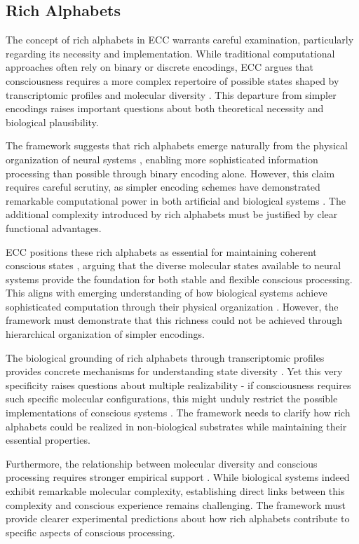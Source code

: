 \subsection{Rich Alphabets}

The concept of rich alphabets in ECC warrants careful examination, particularly regarding its necessity and implementation. While traditional computational approaches often rely on binary or discrete encodings, ECC argues that consciousness requires a more complex repertoire of possible states shaped by transcriptomic profiles and molecular diversity \cite{koch2019feeling}. This departure from simpler encodings raises important questions about both theoretical necessity and biological plausibility.

The framework suggests that rich alphabets emerge naturally from the physical organization of neural systems \cite{varela2016embodied}, enabling more sophisticated information processing than possible through binary encoding alone. However, this claim requires careful scrutiny, as simpler encoding schemes have demonstrated remarkable computational power in both artificial and biological systems \cite{dennett2017bacteria}. The additional complexity introduced by rich alphabets must be justified by clear functional advantages.

ECC positions these rich alphabets as essential for maintaining coherent conscious states \cite{thompson2014waking}, arguing that the diverse molecular states available to neural systems provide the foundation for both stable and flexible conscious processing. This aligns with emerging understanding of how biological systems achieve sophisticated computation through their physical organization \cite{feinberg2016ancient}. However, the framework must demonstrate that this richness could not be achieved through hierarchical organization of simpler encodings.

The biological grounding of rich alphabets through transcriptomic profiles provides concrete mechanisms for understanding state diversity \cite{churchland2013touching}. Yet this very specificity raises questions about multiple realizability - if consciousness requires such specific molecular configurations, this might unduly restrict the possible implementations of conscious systems \cite{goff2019galileo}. The framework needs to clarify how rich alphabets could be realized in non-biological substrates while maintaining their essential properties.

Furthermore, the relationship between molecular diversity and conscious processing requires stronger empirical support \cite{noe2009out}. While biological systems indeed exhibit remarkable molecular complexity, establishing direct links between this complexity and conscious experience remains challenging. The framework must provide clearer experimental predictions about how rich alphabets contribute to specific aspects of conscious processing.

